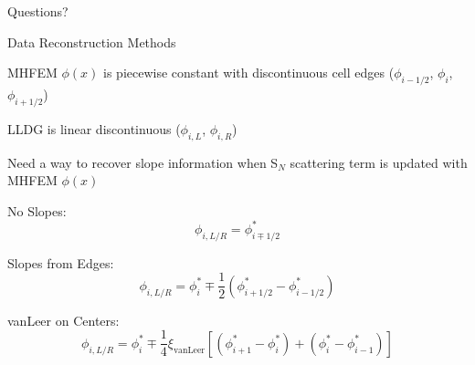 \documentclass[10pt,draft]{beamer}
\newcommand{\SN}{S$_N$\xspace}
\begin{document}
\begin{frame}[standout]
  Questions?
\end{frame}

\begin{frame}{Data Reconstruction Methods}

	MHFEM $\phi(x)$ is piecewise constant with discontinuous cell edges ($\phi_{i-1/2}$, $\phi_i$, $\phi_{i+1/2}$)

	LLDG is linear discontinuous ($\phi_{i,L}$, $\phi_{i,R}$)

	Need a way to recover slope information when \SN scattering term is updated with MHFEM $\phi(x)$ 

	No Slopes: 
	\begin{equation*}
		\phi_{i,L/R} = \phi_{i\mp1/2}^*
	\end{equation*}

	Slopes from Edges: 
	\begin{equation*}
		\phi_{i,L/R} = \phi_i^* \mp \frac{1}{2} \left(
		\phi_{i+1/2}^* - \phi_{i-1/2}^* \right)
	\end{equation*}

	vanLeer on Centers: 
	\begin{equation*}
		\phi_{i,L/R} = \phi_i^* \mp \frac{1}{4} \xi_\text{vanLeer} \left[ 
			\left(\phi_{i+1}^* - \phi_i^*\right) + \left(\phi_{i}^* - \phi_{i-1}^*\right)
		 \right]
	\end{equation*}

\end{frame}
\end{document}
